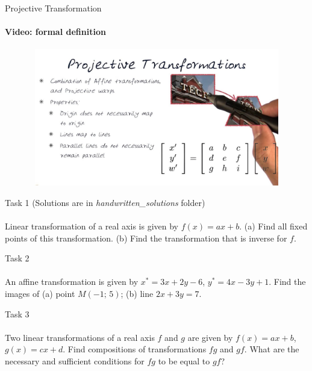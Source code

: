 \documentclass[aspectratio=169]{beamer}
\begin{document}
    \begin{frame}[t]{Projective Transformation}
        \framesubtitle{Video: formal definition}
        \vspace{-0.6cm}
        \begin{figure}[H]
            \href{https://www.youtube.com/watch?v=uyYKPUZg3og}{
                \centering\includegraphics[height=6cm,width=1\textwidth,keepaspectratio]{proj_def.jpg}}
            \label{fig:proj_def.jpg}
        \end{figure}
    \end{frame}
    

\begin{frame}[t]{Task 1 (Solutions are in \textit{handwritten\_solutions} folder)}
    \framesubtitle{}
    Linear transformation of a real axis is given by $f(x)=ax+b$. (a) Find all fixed points of this transformation. (b) Find the transformation that is inverse for $f$.

\end{frame}

\begin{frame}[t]{Task 2}
    \framesubtitle{}
    An affine transformation is given by $x^*=3x+2y-6$, $y^*=4x-3y+1$. Find the images of (a) point $M(-1;\,5)$; (b) line $2x+3y=7$.

\end{frame}


\begin{frame}[t]{Task 3}
    \framesubtitle{}
    Two linear transformations of a real axis $f$ and $g$ are given by $f(x)=ax+b$, $g(x)=cx+d$. Find compositions of transformations $fg$ and $gf$. What are the necessary and sufficient conditions for $fg$ to be equal to $gf$?
    
\end{frame}
\end{document}
